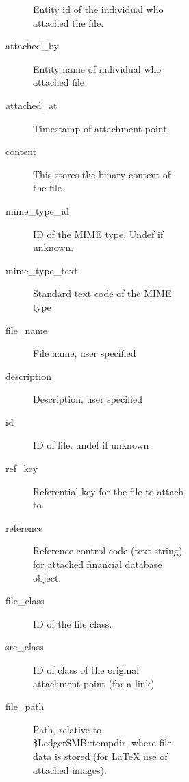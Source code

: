 \begin{description}
\begin{description}
\begin{description}
\begin{description}
\begin{description}
\begin{description}
\begin{description}
Entity id of the individual who attached the file.


\item[{attached\_by}] \mbox{}

Entity name of individual who attached file


\item[{attached\_at}] \mbox{}

Timestamp of attachment point.


\item[{content}] \mbox{}

This stores the binary content of the file.


\item[{mime\_type\_id}] \mbox{}

ID of the MIME type.  Undef if unknown.


\item[{mime\_type\_text}] \mbox{}

Standard text code of the MIME type


\item[{file\_name}] \mbox{}

File name, user specified


\item[{description}] \mbox{}

Description, user specified


\item[{id}] \mbox{}

ID of file.  undef if unknown


\item[{ref\_key}] \mbox{}

Referential key for the file to attach to.


\item[{reference}] \mbox{}

Reference control code (text string) for attached financial database object.


\item[{file\_class}] \mbox{}

ID of the file class.


\item[{src\_class}] \mbox{}

ID of class of the original attachment point (for a link)


\item[{file\_path}] \mbox{}

Path, relative to \$LedgerSMB::tempdir, where file data is stored (for LaTeX use
of attached images).



\end{description}
\end{description}
\end{description}
\end{description}
\end{description}
\end{description}
\end{description}
